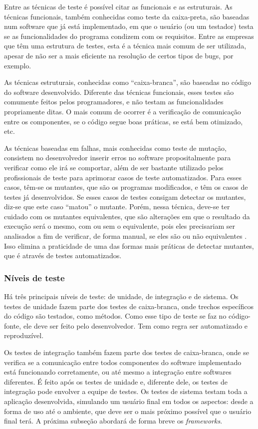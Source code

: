 \documentclass[twoside,english,brazilian]{UNISINOSartigo}
\begin{document}
Entre as técnicas de teste é possível citar as funcionais e as estruturais. As técnicas funcionais, também conhecidas como teste da caixa-preta, são baseadas num software que já está implementado, em que o usuário (ou um testador) testa se as funcionalidades do programa condizem com os requisitos. Entre as empresas que têm uma estrutura de testes, esta é a técnica mais comum de ser utilizada, apesar de não ser a mais eficiente na resolução de certos tipos de bugs, por exemplo. 

As técnicas estruturais, conhecidas como ``caixa-branca'', são baseadas no código do software desenvolvido. Diferente das técnicas funcionais, esses testes são comumente feitos pelos programadores, e não testam as funcionalidades propriamente ditas. O mais comum de ocorrer é a verificação de comunicação entre os componentes, se o código segue boas práticas, se está bem otimizado, etc.  

As técnicas baseadas em falhas, mais conhecidas como teste de mutação, consistem no desenvolvedor inserir erros no software propositalmente para verificar como ele irá se comportar, além de ser bastante utilizado pelos profissionais de teste para aprimorar casos de teste automatizados. Para esses casos, têm-se os mutantes, que são os programas modificados, e têm os casos de testes já desenvolvidos. Se esses casos de testes consigam detectar os mutantes, diz-se que este caso ``matou'' o mutante. Porém, nessa técnica, deve-se ter cuidado com os mutantes equivalentes, que são alterações em que o resultado da execução será o mesmo, com ou sem o equivalente, pois eles precisariam ser analisados a fim de verificar, de forma manual, se eles são ou não equivalentes \cite{guilhon_2015}. Isso elimina a praticidade de uma das formas mais práticas de detectar mutantes, que é através de testes automatizados. 


\subsubsection{Níveis de teste}
Há três principais níveis de teste: de unidade, de integração e de sistema. Os testes de unidade fazem parte dos testes de caixa-branca, onde trechos específicos do código são testados, como métodos. Como esse tipo de teste se faz no código-fonte, ele deve ser feito pelo desenvolvedor. Tem como regra ser automatizado e reproduzível.

Os testes de integração também fazem parte dos testes de caixa-branca, onde se verifica se a comunicação entre todos componentes do software implementado está funcionando corretamente, ou até mesmo a integração entre softwares diferentes. É feito após os testes de unidade e, diferente dele, os testes de integração pode envolver a equipe de testes. Os testes de sistema testam toda a aplicação desenvolvida, simulando um usuário final em todos os aspectos: desde a forma de uso até o ambiente, que deve ser o mais próximo possível que o usuário final terá. A próxima subseção abordará de forma breve os \textit{frameworks}.
\end{document}
